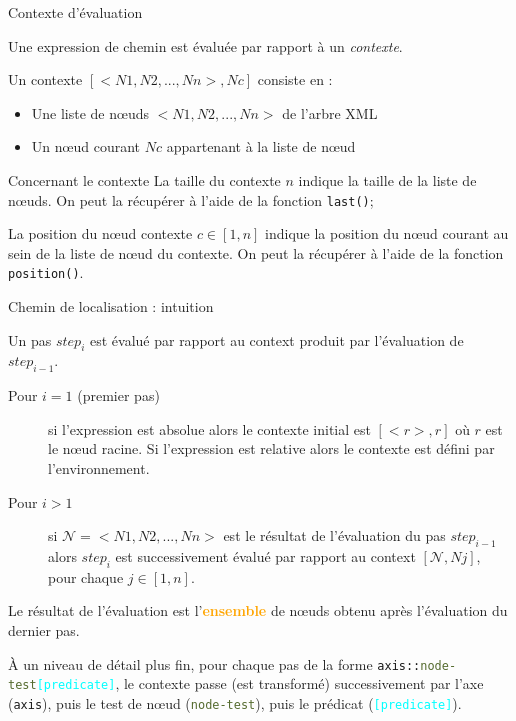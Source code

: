 \begin{frame}{Contexte d'évaluation}

Une expression de chemin est \'evalu\'ee par rapport \`a un \textit{contexte}.

\bigskip

Un contexte $[< N1,N2,...,Nn >,Nc]$ consiste en \cite{WDMD} :
\begin{itemize}
\item Une liste de n{\oe}uds $< N1,N2,...,Nn >$ de l'arbre XML
\item Un n{\oe}ud courant $Nc$ appartenant à la liste de n{\oe}ud
\end{itemize}

\medskip

\begin{block}{Concernant le contexte}
La taille du contexte $n$ indique la taille de la liste de n{\oe}uds. On peut la récupérer à l'aide de la fonction \verb?last()?;

\medskip

La position du n{\oe}ud contexte $c \in [1, n]$ indique la position du n{\oe}ud courant au sein de la liste de n{\oe}ud du contexte.
On peut la récupérer à l'aide de la fonction \verb?position()?.
\end{block}


\end{frame}


\begin{frame}[allowframebreaks]{Chemin de localisation : intuition}

\begin{center}
\end{center}


\framebreak
\cite{WDMD} Un pas $step_i$ est évalué par rapport au context produit par l'évaluation de $step_{i-1}$. 

\begin{description}
\item[Pour $i=1$ (premier pas)] si l'expression est absolue alors le contexte initial est $[<r>,r]$ où $r$ est le n{\oe}ud racine. Si l'expression est relative alors le contexte est défini par l'environnement.
\item[Pour $i > 1$] si $\mathcal{N} =< N1,N2,...,Nn >$ est le résultat de l'évaluation du pas $step_{i-1}$ alors $step_i$  est successivement évalué par rapport au context $[\mathcal{N},Nj]$, pour chaque $j \in [1,n]$.
\end{description}
Le résultat de l'évaluation est l'\textcolor{orange}{\textbf{ensemble}} de n{\oe}uds obtenu après l'évaluation du dernier pas.

\medskip

\`A un niveau de d\'etail plus fin, pour chaque pas de la forme \texttt{\textcolor{indiaRed}{axis}::\textcolor{DarkOliveGreen}{node-test}\textcolor{cyan}{[predicate]}}, le contexte passe (est transform\'e) successivement par l'axe (\texttt{\textcolor{indiaRed}{axis}}), puis le test de n{\oe}ud (\texttt{\textcolor{DarkOliveGreen}{node-test}}), puis le pr\'edicat (\texttt{\textcolor{cyan}{[predicate]}}). 

\end{frame}


